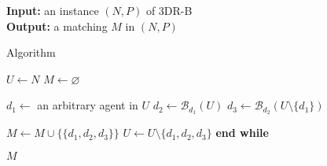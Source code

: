 \begin{algorithm}
\textbf{Input:} an instance $(N, P)$ of 3DR-B\\
\textbf{Output:} a matching $M$ in $(N, P)$
\smallskip
\begin{algorithmic}
\caption{Algorithm~ \label{alg:threed_sr_b_dictatorship}} 

\State $U \gets N$
\State $M \gets \varnothing$

    \State $d_1 \gets$ an arbitrary agent in $U$
    \State $d_2 \gets \mathscr{B}_{d_1}(U)$
    \State $d_3 \gets \mathscr{B}_{d_2}(U \setminus \{ d_1 \})$
    
    \State $M \gets M \cup \{ \{ d_1, d_2, d_3 \} \}$
    \State $U \gets U \setminus \{ d_1, d_2, d_3 \}$
\EndWhile
\State \textbf{end while}
\smallskip

\State \Return $M$
\end{algorithmic}
\end{algorithm}
